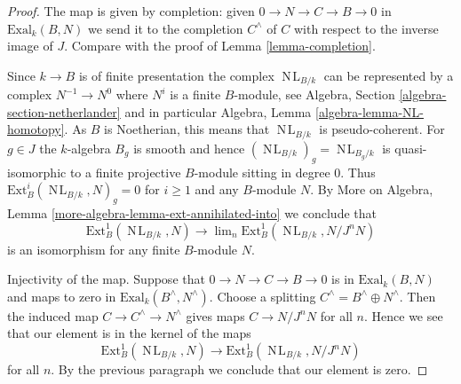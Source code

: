 \documentclass{stacks-project}
\theoremstyle{plain}
\theoremstyle{definition}
\theoremstyle{remark}
\numberwithin{equation}{subsection}
\def\lim{\mathop{\mathrm{lim}}\nolimits}
\def\NL{\mathop{N\!L}\nolimits}
\begin{document}
\begin{proof}
The map is given by completion: given $0 \to N \to C \to B \to 0$
in $\text{Exal}_k(B, N)$ we send it to the completion $C^\wedge$
of $C$ with respect to the inverse image of $J$. Compare with
the proof of Lemma \ref{lemma-completion}.

\medskip\noindent
Since $k \to B$ is of finite presentation the complex
$\NL_{B/k}$ can be represented by a complex
$N^{-1} \to N^0$ where $N^i$ is a finite $B$-module, see
Algebra, Section \ref{algebra-section-netherlander} and
in particular
Algebra, Lemma \ref{algebra-lemma-NL-homotopy}.
As $B$ is Noetherian, this means that $\NL_{B/k}$
is pseudo-coherent. For $g \in J$ the $k$-algebra $B_g$
is smooth and hence $(\NL_{B/k})_g = \NL_{B_g/k}$
is quasi-isomorphic to a finite projective $B$-module sitting in degree $0$.
Thus $\text{Ext}^i_B(\NL_{B/k}, N)_g = 0$ for $i \geq 1$
and any $B$-module $N$. By
More on Algebra, Lemma \ref{more-algebra-lemma-ext-annihilated-into}
we conclude that
$$
\text{Ext}^1_B(\NL_{B/k}, N) \longrightarrow
\lim_n \text{Ext}^1_B(\NL_{B/k}, N/J^n N)
$$
is an isomorphism for any finite $B$-module $N$.

\medskip\noindent
Injectivity of the map.
Suppose that $0 \to N \to C \to B \to 0$ is in $\text{Exal}_k(B, N)$
and maps to zero in $\text{Exal}_k(B^\wedge, N^\wedge)$.
Choose a splitting $C^\wedge = B^\wedge \oplus N^\wedge$.
Then the induced map $C \to C^\wedge \to N^\wedge$
gives maps $C \to N/J^nN$ for all $n$.
Hence we see that our element is in the kernel of the maps
$$
\text{Ext}^1_B(\NL_{B/k}, N) \to
\text{Ext}^1_B(\NL_{B/k}, N/J^n N)
$$
for all $n$. By the previous paragraph we conclude that
our element is zero.


\end{proof}
\end{document}
